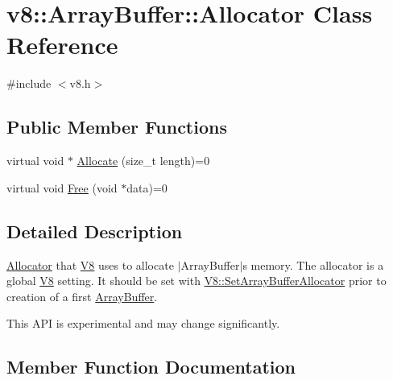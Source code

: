 \hypertarget{classv8_1_1_array_buffer_1_1_allocator}{}\section{v8\+:\+:Array\+Buffer\+:\+:Allocator Class Reference}
\label{classv8_1_1_array_buffer_1_1_allocator}


{\ttfamily \#include $<$v8.\+h$>$}

\subsection*{Public Member Functions}
\begin{DoxyCompactItemize}
\item 
virtual void $\ast$ \hyperlink{classv8_1_1_array_buffer_1_1_allocator_a106b0d80120ed04fe9b9675e96f0340b}{Allocate} (size\+\_\+t length)=0
\item 
virtual void \hyperlink{classv8_1_1_array_buffer_1_1_allocator_a449804e1ec2578d30b5ddcc0402ddb5c}{Free} (void $\ast$data)=0
\end{DoxyCompactItemize}


\subsection{Detailed Description}
\hyperlink{classv8_1_1_array_buffer_1_1_allocator}{Allocator} that \hyperlink{classv8_1_1_v8}{V8} uses to allocate $\vert$\+Array\+Buffer$\vert$\textquotesingle{}s memory. The allocator is a global \hyperlink{classv8_1_1_v8}{V8} setting. It should be set with \hyperlink{classv8_1_1_v8_abc40950a39f8cb6946dc8a1ad41eea84}{V8\+::\+Set\+Array\+Buffer\+Allocator} prior to creation of a first \hyperlink{classv8_1_1_array_buffer}{Array\+Buffer}.

This A\+P\+I is experimental and may change significantly. 

\subsection{Member Function Documentation}
\hypertarget{classv8_1_1_array_buffer_1_1_allocator_a106b0d80120ed04fe9b9675e96f0340b}{}
